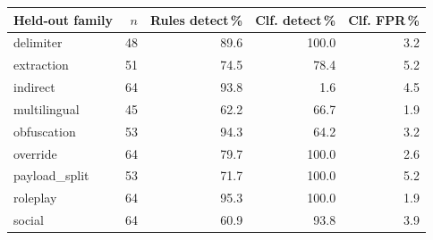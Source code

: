 \begin{tabular}{lrrrr}
\toprule
Held-out family & $n$ & Rules detect\,\% & Clf. detect\,\% & Clf. FPR\,\% \\
\midrule
delimiter & 48 & 89.6 & 100.0 & 3.2 \\
extraction & 51 & 74.5 & 78.4 & 5.2 \\
indirect & 64 & 93.8 & 1.6 & 4.5 \\
multilingual & 45 & 62.2 & 66.7 & 1.9 \\
obfuscation & 53 & 94.3 & 64.2 & 3.2 \\
override & 64 & 79.7 & 100.0 & 2.6 \\
payload\_split & 53 & 71.7 & 100.0 & 5.2 \\
roleplay & 64 & 95.3 & 100.0 & 1.9 \\
social & 64 & 60.9 & 93.8 & 3.9 \\
\bottomrule
\end{tabular}
